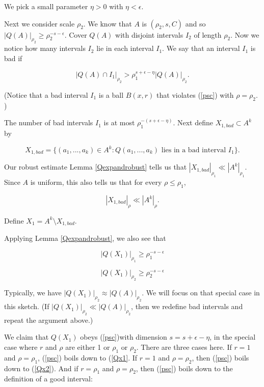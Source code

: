 \documentclass[12pt]{amsart}
\begin{document}
We pick a small parameter $\eta > 0$ with $\eta < \epsilon$.

Next we consider scale $\rho_2$.    We know that $A$ is $(\rho_2, s, C)$ and so $|Q(A)|_{\rho_2} \ge \rho_2^{-s - \epsilon}$.   Cover $Q(A)$ with disjoint intervals $I_2$ of length $\rho_2$.   Now we notice how many intervals $I_2$ lie in each interval $I_1$.   We say that an interval $I_1$ is bad if

$$ |Q(A) \cap I_1|_{\rho_2} > \rho_1^{s + \epsilon - \eta} |Q(A)|_{\rho_2}. $$

(Notice that a bad interval $I_1$ is a ball $B(x,r)$ that violates (\ref{psc}) with $\rho = \rho_2$. )

The number of bad intervals $I_1$ is at most $\rho_1^{-(s + \epsilon - \eta)}$.    Next define $X_{1, bad} \subset A^k$ by

$$ X_{1,bad} = \{ (a_1, ..., a_k) \in A^k: Q(a_1, ..., a_k) \textrm{ lies in a bad interval } I_1 \}. $$

Our robust estimate Lemma \ref{Qexpandrobust} tells us that $|X_{1,bad}|_{\rho_1} \ll |A^k|_{\rho_1}$.   Since $A$ is uniform,  this also tells us that for every $\rho \le \rho_1$, 

$$ |X_{1, bad}|_\rho \ll |A^k|_\rho.$$

Define $X_1 = A^k \setminus X_{1,bad}$.  

Applying Lemma \ref{Qexpandrobust},  we also see that 

\begin{equation}  \label{Qx1}
|Q(X_1)|_{\rho_1} \ge \rho_1^{-s -\epsilon}
\end{equation}

\begin{equation}  \label{Qx2}
|Q(X_1)|_{\rho_2} \ge \rho_2^{-s -\epsilon}
\end{equation}

Typically,  we have $|Q(X_1)|_{\rho_2} \approx |Q(A)|_{\rho_2}$.   We will focus on that special case in this sketch.   (If $|Q(X_1)|_{\rho_2} \ll |Q(A)|_{\rho_2}$, then we redefine bad intervals and repeat the argument above.)

 We claim that $Q(X_1)$ obeys (\ref{psc})with dimension $s = s + \epsilon - \eta$,  in the special case where $r$ and $\rho$ are either 1 or $\rho_1$ or $\rho_2$.   There are three cases here.   If $r = 1$ and $\rho = \rho_1$,  (\ref{psc}) boils down to (\ref{Qx1}.  If $r=1$ and $\rho = \rho_2$,  then (\ref{psc}) boils down to (\ref{Qx2}).   And if $r = \rho_1$ and $\rho = \rho_2$,  then (\ref{psc}) boils down to the definition of a good interval:
 
\end{document}
